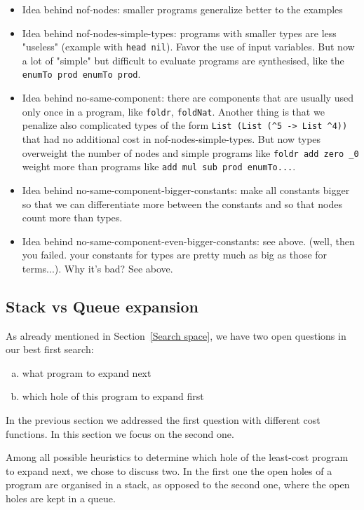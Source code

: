 \begin{itemize}
\item Idea behind nof-nodes: smaller programs generalize better to the examples
\item Idea behind nof-nodes-simple-types: programs with smaller types are less "useless" (example with \lstinline?head nil?). Favor the use of input variables. But now a lot of "simple" but difficult to evaluate programs are synthesised, like the \lstinline?enumTo prod enumTo prod?.
\item Idea behind no-same-component: there are components that are usually used only once in a program, like \lstinline?foldr?, \lstinline?foldNat?. Another thing is that we penalize also complicated types of the form \lstinline?List (List (^5 -> List ^4))? that had no additional cost in nof-nodes-simple-types. But now types overweight the number of nodes and simple programs like \lstinline?foldr add zero _0? weight more than programs like \lstinline?add mul sub prod enumTo...?.
\item Idea behind no-same-component-bigger-constants: make all constants bigger so that we can differentiate more between the constants and so that nodes count more than types.
\item Idea behind no-same-component-even-bigger-constants: see above. (well, then you failed. your constants for types are pretty much as big as those for terms...). Why it's bad? See above.
\end{itemize}

\subsection{Stack vs Queue expansion}
As already mentioned in Section~\ref{Search space}, we have two open questions in our best first search:
\begin{enumerate}[a.]
\item what program to expand next
\item which hole of this program to expand first
\end{enumerate}
In the previous section we addressed the first question with different cost functions. In this section we focus on the second one.

Among all possible heuristics to determine which hole of the least-cost program to expand next, we chose to discuss two. In the first one the open holes of a program are organised in a stack, as opposed to the second one, where the open holes are kept in a queue.

